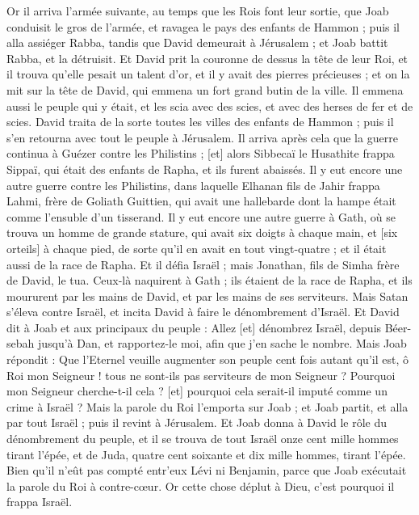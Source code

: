 \begin{multicols}{2}
\VerseOne{}Or il arriva l'armée suivante, au temps que les Rois font leur sortie, que Joab conduisit le gros de l'armée, et ravagea le pays des enfants de Hammon ; puis il alla assiéger Rabba, tandis que David demeurait à Jérusalem ; et Joab battit Rabba, et la détruisit.
Et David prit la couronne de dessus la tête de leur Roi, et il trouva qu'elle pesait un talent d'or, et il y avait des pierres précieuses ; et on la mit sur la tête de David, qui emmena un fort grand butin de la ville.
Il emmena aussi le peuple qui y était, et les scia avec des scies, et avec des herses de fer et de scies. David traita de la sorte toutes les villes des enfants de Hammon ; puis il s'en retourna avec tout le peuple à Jérusalem.
Il arriva après cela que la guerre continua à Guézer contre les Philistins ; [et] alors Sibbecaï le Husathite frappa Sippaï, qui était des enfants de Rapha, et ils furent abaissés.
Il y eut encore une autre guerre contre les Philistins, dans laquelle Elhanan fils de Jahir frappa Lahmi, frère de Goliath Guittien, qui avait une hallebarde dont la hampe était comme l'ensuble d'un tisserand.
Il y eut encore une autre guerre à Gath, où se trouva un homme de grande stature, qui avait six doigts à chaque main, et [six orteils] à chaque pied, de sorte qu'il en avait en tout vingt-quatre ; et il était aussi de la race de Rapha.
Et il défia Israël ; mais Jonathan, fils de Simha frère de David, le tua.
Ceux-là naquirent à Gath ; ils étaient de la race de Rapha, et ils moururent par les mains de David, et par les mains de ses serviteurs.
\VerseOne{}Mais Satan s'éleva contre Israël, et incita David à faire le dénombrement d'Israël.
Et David dit à Joab et aux principaux du peuple : Allez [et] dénombrez Israël, depuis Béer-sebah jusqu'à Dan, et rapportez-le moi, afin que j'en sache le nombre.
Mais Joab répondit : Que l'Eternel veuille augmenter son peuple cent fois autant qu'il est, ô Roi mon Seigneur ! tous ne sont-ils pas serviteurs de mon Seigneur ? Pourquoi mon Seigneur cherche-t-il cela ? [et] pourquoi cela serait-il imputé comme un crime à Israël ?
Mais la parole du Roi l'emporta sur Joab ; et Joab partit, et alla par tout Israël ; puis il revint à Jérusalem.
Et Joab donna à David le rôle du dénombrement du peuple, et il se trouva de tout Israël onze cent mille hommes tirant l'épée, et de Juda, quatre cent soixante et dix mille hommes, tirant l'épée.
Bien qu'il n'eût pas compté entr'eux Lévi ni Benjamin, parce que Joab exécutait la parole du Roi à contre-cœur.
Or cette chose déplut à Dieu, c'est pourquoi il frappa Israël.

\end{multicols}
